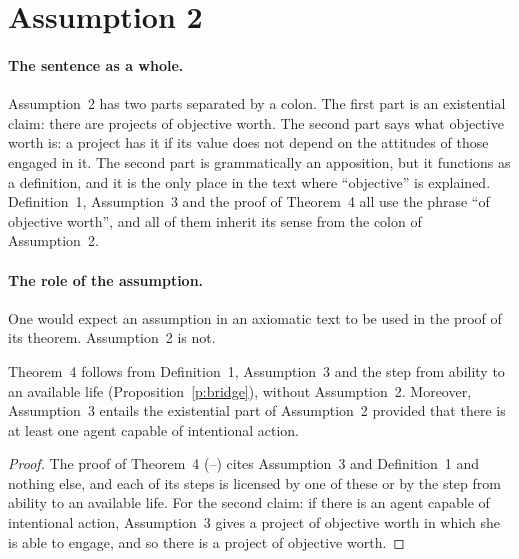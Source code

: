 \section{Assumption 2}\label{s:ass2}


\paragraph{The sentence as a whole.} Assumption~2 has two parts separated by a colon. The first part is an existential claim: there are projects of objective worth. The second part says what objective worth is: a project has it if its value does not depend on the attitudes of those engaged in it. The second part is grammatically an apposition, but it functions as a definition, and it is the only place in the text where \enquote{objective} is explained. Definition~1, Assumption~3 and the proof of Theorem~4 all use the phrase \enquote{of objective worth}, and all of them inherit its sense from the colon of Assumption~2.

\paragraph{The role of the assumption.} One would expect an assumption in an axiomatic text to be used in the proof of its theorem. Assumption~2 is not.

\begin{proposition}\label{p:redundant}
Theorem~4 follows from Definition~1, Assumption~3 and the step from ability to an available life (Proposition~\ref{p:bridge}), without Assumption~2. Moreover, Assumption~3 entails the existential part of Assumption~2 provided that there is at least one agent capable of intentional action.
\end{proposition}

\begin{proof}
The proof of Theorem~4 (--) cites Assumption~3 and Definition~1 and nothing else, and each of its steps is licensed by one of these or by the step from ability to an available life. For the second claim: if there is an agent capable of intentional action, Assumption~3 gives a project of objective worth in which she is able to engage, and so there is a project of objective worth.
\end{proof}


